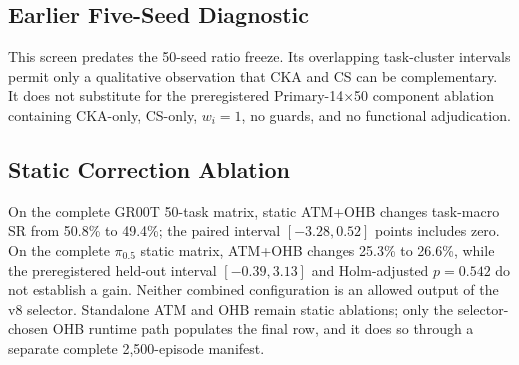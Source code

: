 \subsection{Earlier Five-Seed Diagnostic}



This screen predates the 50-seed ratio freeze. Its overlapping task-cluster intervals permit only a qualitative observation that CKA and CS can be complementary. It does not substitute for the preregistered Primary-14$\times$50 component ablation containing CKA-only, CS-only, $w_i=1$, no guards, and no functional adjudication.

\subsection{Static Correction Ablation}

On the complete GR00T 50-task matrix, static ATM+OHB changes task-macro SR from 50.8\% to 49.4\%; the paired interval $[-3.28,0.52]$ points includes zero. On the complete $\pi_{0.5}$ static matrix, ATM+OHB changes 25.3\% to 26.6\%, while the preregistered held-out interval $[-0.39,3.13]$ and Holm-adjusted $p=0.542$ do not establish a gain. Neither combined configuration is an allowed output of the v8 selector. Standalone ATM and OHB remain static ablations; only the selector-chosen OHB runtime path populates the final row, and it does so through a separate complete 2,500-episode manifest.
